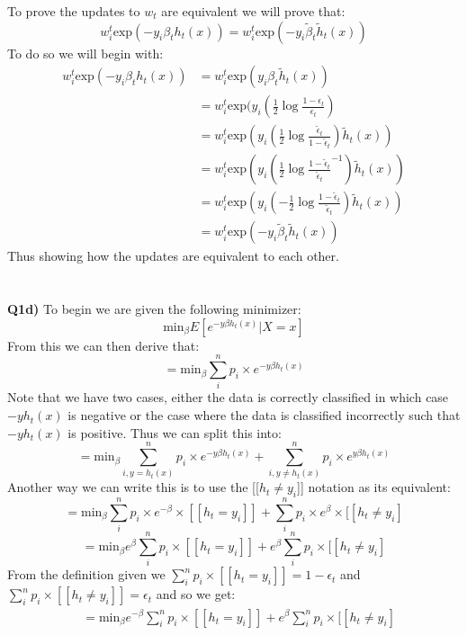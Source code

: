 \documentclass{article}
\begin{document}
\begin{titlepage}
To prove the updates to $w_t$ are equivalent we will prove that:
\[ w^t_i \text{exp}(-y_i\beta_th_t(x)) = w^t_i \text{exp}(-y_i\widetilde{\beta}_t\widetilde{h}_t(x)) \]
To do so we will begin with:
\begin{align*}
w^t_i \text{exp}(-y_i\beta_th_t(x)) &= w^t_i \text{exp}(y_i\beta_t\widetilde{h}_t(x)) \\
&= w^t_i \text{exp}(y_i( \frac{1}{2} \log \frac{1-\epsilon_t}{\epsilon_t} ) \\
&= w^t_i \text{exp}(y_i( \frac{1}{2} \log \frac{\widetilde{\epsilon}_t}{1- \widetilde{\epsilon}_t} ) \widetilde{h}_t(x)) \\
&= w^t_i \text{exp}(y_i( \frac{1}{2} \log \frac{1- \widetilde{\epsilon}_t}{\widetilde{\epsilon}_t}^{-1} ) \widetilde{h}_t(x))  \\
&= w^t_i \text{exp}(y_i( - \frac{1}{2} \log \frac{1- \widetilde{\epsilon}_t}{\widetilde{\epsilon}_t} ) \widetilde{h}_t(x)) \\
&= w^t_i \text{exp}(- y_i\widetilde{\beta}_t \widetilde{h}_t(x)) 
\end{align*}
Thus showing how the updates are equivalent to each other.\\\\\\
\textbf{Q1d)} To begin we are given the following minimizer:
\[ \text{min}_{\beta} E[e^{-y\beta h_t(x)} |X=x] \]
From this we can then derive that:
\[ = \text{min}_{\beta} \sum_i^n p_i \times e^{-y\beta h_t(x)} \]
Note that we have two cases, either the data is correctly classified in which case $-yh_t(x)$ is negative or the case where the data is classified incorrectly such that $-yh_t(x)$ is positive. Thus we can split this into:
\[  = \text{min}_{\beta} \sum_{i, y=h_t(x)}^n p_i \times e^{-y\beta h_t(x)} +  \sum_{i, y\neq h_t(x)}^n p_i \times e^{y\beta h_t(x)} \]
Another way we can write this is to use the [[$h_t \neq y_i$]] notation as its equivalent: 
\[  = \text{min}_{\beta} \sum_{i}^n p_i \times e^{-\beta} \times [[h_t = y_i]] +  \sum_{i}^n p_i \times e^{\beta} \times [[h_t \neq y_i] \]
\[  = \text{min}_{\beta}  e^{\beta} \sum_{i}^n p_i \times [[h_t = y_i]] +  e^{\beta} \sum_{i}^n p_i \times [[h_t \neq y_i] \]
From the definition given we $\sum_{i}^n p_i \times [[h_t = y_i]] = 1 - \epsilon_t$ and $\sum_{i}^n p_i \times [[h_t \neq y_i]] = \epsilon_t$ and so we get:
\begin{align*}
&= \text{min}_{\beta}  e^{-\beta} \sum_{i}^n p_i \times [[h_t = y_i]] +  e^{\beta} \sum_{i}^n p_i \times [[h_t \neq y_i] \\

\end{align*}
\end{titlepage}
\end{document}
